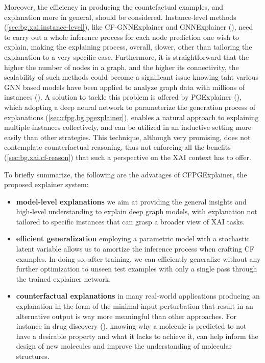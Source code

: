\documentclass[binding=0.6cm]{sapthesis}
\newcommand{\mycite}[1]{(\cite{#1})}
\begin{document}
Moreover, the efficiency in producing the countefactual examples, and explanation more in general, should be considered. Instance-level methods (\cref{sec:bg.xai.instance-level}), like CF-GNNExplainer and GNNExplainer \mycite{ying2019-gnnexplainer}, need to carry out a whole inference process for each node prediction one wish to explain, making the explaining process, overall, slower, other than tailoring the explanation to a very specific case. Furthermore, it is straightforward that the higher the number of nodes in a graph, and the higher its connectivity, the scalability of such methods could become a significant issue knowing taht various GNN based models have been applied to analyze graph data with millions of instances \mycite{ying2018-web-graphCN}. A solution to tackle this problem is offered by PGExplainer \mycite{luo2020-pgexplainer}, which adopting a deep neural network to parameterize the generation process of explanations (\cref{sec:cfpg.bg.pgexplainer}), enables a natural approach to explaining multiple instances collectively, and can be utilized in an inductive setting more easily than other strategies. This technique, although very promising, does not contemplate counterfactual reasoning, thus not enforcing all the benefits (\cref{sec:bg.xai.cf-reason}) that such a perspective on the XAI context has to offer. 

To briefly summarize, the following are the advatages of CFPGExplainer, the proposed explainer system:
\begin{itemize}
    \item \textbf{model-level explanations} we aim at providing the general insights and high-level understanding to explain deep graph models, with explanation not tailored to specific instances that can grasp a broader view of XAI tasks. 
    \item \textbf{efficient generalization} employing a parametric model with a stochastic latent variable allows us to amortize the inference process when crafting CF examples. In doing so, after training, we can efficiently generalize without any further optimization to unseen test examples with only a single pass through the trained explainer network.
    \item \textbf{counterfactual explanations} in many real-world applications producing an explanation in the form of the minimal input perturbation that result in an alternative output is way more meaningful than other approaches. For instance in drug discovery \mycite{stokes2020-antibiotic,xie2021-mars}, knowing why a molecule is predicted to not have a desirable property and what it lacks to achieve it, can help inform the design of new molecules and improve the understanding of molecular structures. 
\end{itemize}
\end{document}
